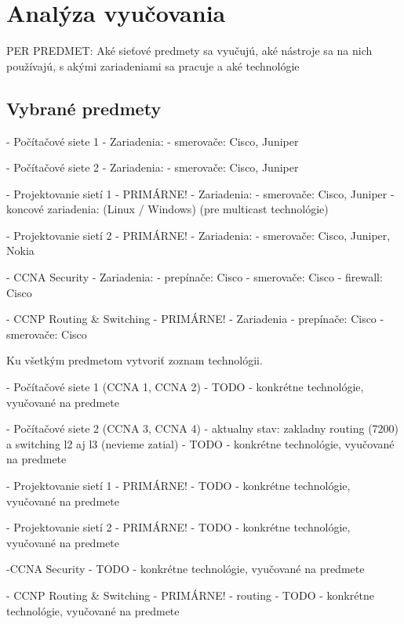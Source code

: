 \chapter{Analýza vyučovania}
\label{chap:analyza_vyucovania}

PER PREDMET: Aké sieťové predmety sa vyučujú, aké nástroje sa na nich používajú, s akými zariadeniami sa pracuje a aké technológie


\section{Vybrané predmety}

- Počítačové siete 1
  - Zariadenia:
    - smerovače: Cisco, Juniper

- Počítačové siete 2
  - Zariadenia:
    - smerovače: Cisco, Juniper

- Projektovanie sietí 1 - PRIMÁRNE!
  - Zariadenia:
    - smerovače: Cisco, Juniper
    - koncové zariadenia: (Linux / Windows) (pre multicast technológie)

- Projektovanie sietí 2 - PRIMÁRNE!
  - Zariadenia:
    - smerovače: Cisco, Juniper, Nokia

- CCNA Security
  - Zariadenia:
    - prepínače: Cisco
    - smerovače: Cisco
    - firewall: Cisco
                
- CCNP Routing \& Switching - PRIMÁRNE!
  - Zariadenia
    - prepínače: Cisco
    - smerovače: Cisco
    
    
    


Ku všetkým predmetom vytvoriť zoznam technológii.




- Počítačové siete 1 (CCNA 1, CCNA 2)
  - TODO - konkrétne technológie, vyučované na predmete

- Počítačové siete 2 (CCNA 3, CCNA 4)
  - aktualny stav: zakladny routing (7200) a switching l2 aj l3 (nevieme zatial)
  - TODO - konkrétne technológie, vyučované na predmete

- Projektovanie sietí 1 - PRIMÁRNE!
  - TODO - konkrétne technológie, vyučované na predmete

- Projektovanie sietí 2 - PRIMÁRNE!
  - TODO - konkrétne technológie, vyučované na predmete

-CCNA Security
  - TODO - konkrétne technológie, vyučované na predmete

- CCNP Routing \& Switching - PRIMÁRNE!
  - routing
  - TODO - konkrétne technológie, vyučované na predmete

